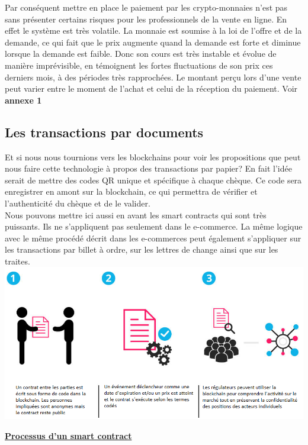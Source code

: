 \documentclass[12pt]{report}
\begin{document}
\hspace{1cm}Par conséquent mettre en place le paiement par les crypto-monnaies n'est pas sans présenter certains risques pour les professionnels de la vente en ligne. En effet le système est très volatile. La monnaie est soumise à la loi de l'offre et de la demande, ce qui fait que le prix augmente quand la demande est forte et diminue lorsque la demande est faible. Donc son cours est très instable et évolue de manière imprévisible, en témoignent les fortes fluctuations de son prix ces derniers mois, à des périodes très rapprochées. Le montant perçu lors d'une vente peut varier entre le moment de l'achat et celui de la réception du paiement. Voir \textbf{annexe 1} \\


    \subsection{Les transactions par documents}
\hspace{1cm} Et si nous nous tournions vers les blockchains pour voir les propositions que peut nous faire cette technologie à propos des transactions par papier? En fait l'idée serait de mettre des codes QR unique et spécifique à chaque chèque. Ce code sera enregistrer en amont sur la blockchain, ce qui permettra de vérifier et l'authenticité du chèque et de le valider. \\

\hspace{1cm} Nous pouvons mettre ici aussi en avant les smart contracts qui sont très puissants. Ils ne s'appliquent pas seulement dans le e-commerce. La même logique avec le même procédé décrit dans les e-commerces peut également s'appliquer sur les transactions par billet à ordre, sur les lettres de change ainsi que sur les traites.\\

\includegraphics[width=1\textwidth]{contract_smart}
\begin{center}
   \textbf{\underline{Processus d'un smart contract}} \\[1cm]
\end{center}
\end{document}
